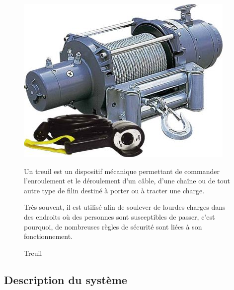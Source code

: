 \begin{figure}[htbp]
\begin{minipage}[c]{.3\linewidth}
\begin{center}
\includegraphics[width=0.9\linewidth]{img/treuil_seul.jpg}
\caption{Treuil}
\label{fig:image11}
\end{center}
\end{minipage}
\hfill
\begin{minipage}[c]{.65\linewidth}
Un treuil est un dispositif mécanique permettant de commander l'enroulement et le déroulement d'un câble, d'une chaîne ou de tout autre type de filin destiné à porter ou à tracter une charge.

Très souvent, il est utilisé afin de soulever de lourdes charges dans des endroits où des personnes sont susceptibles de passer, c'est pourquoi, de nombreuses règles de sécurité sont liées à son fonctionnement.
\end{minipage}
\end{figure}


\subsection{Description du système}

